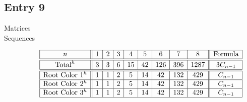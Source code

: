 \documentclass[12pt]{amsart}
\begin{document}
\subsection*{Entry 9}
\begin{description}
    \item[Matrices]\hspace*{\fill}
    
    \item[Sequences]\hspace*{\fill}\vspace{-0.5cm}
    \begin{center}
        \[
        \begin{array}{|c||c|c|c|c|c|c|c|c||c|}\hline
           n  & 1 & 2 & 3 & 4 & 5 & 6 & 7 & 8  & \text{Formula}\\\hline\hline
           \text{Total}^h  & 3 & 3 & 6 & 15 & 42 & 126 & 396 & 1287 & 3C_{n-1}\\\hline\hline
           \text{Root Color }1^h & 1 & 1 & 2 & 5 & 14 & 42 & 132 & 429 & C_{n-1}\\\hline
           \text{Root Color }2^h & 1 & 1 & 2 & 5 & 14 & 42 & 132 & 429 & C_{n-1}\\\hline
           \text{Root Color }3^h & 1 & 1 & 2 & 5 & 14 & 42 & 132 & 429 & C_{n-1}\\\hline
        \end{array}
        \]
    \end{center}
    

\end{description}
\end{document}
